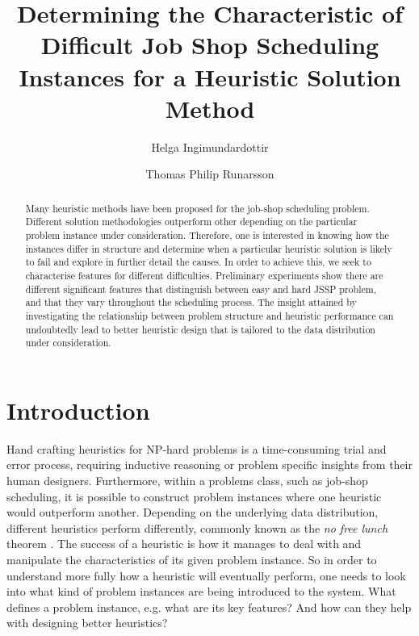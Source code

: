\documentclass[10pt]{llncs} %
\begin{document}
\title{Determining the Characteristic of Difficult Job Shop Scheduling Instances for a Heuristic Solution Method}

\author{Helga Ingimundardottir \and Thomas Philip Runarsson}


\maketitle

\begin{abstract} 
Many heuristic methods have been proposed for the job-shop scheduling problem. Different solution methodologies outperform other depending on the particular problem instance under consideration. Therefore, one is interested in knowing how the instances differ in structure and determine when a particular heuristic solution is likely to fail and explore in further detail the causes. In order to achieve this, we seek to characterise features for different difficulties. Preliminary experiments show there are different significant features that distinguish between easy and hard JSSP problem, and that they vary throughout the scheduling process. 
The insight attained by investigating the relationship between problem structure and heuristic performance can undoubtedly lead to better heuristic design that is tailored to the data distribution under consideration.
\end{abstract}


\section{Introduction}\label{sec:introduction}
Hand crafting heuristics for NP-hard problems is a time-consuming trial and error process, requiring inductive reasoning or problem specific insights from their human designers. Furthermore, within a problems class, such as job-shop scheduling, it is possible to construct problem instances where one heuristic would outperform another. 
Depending on the underlying data distribution, different heuristics perform differently, commonly known as the \emph{no free lunch} theorem \cite{WoMa97:tec}. The success of a heuristic is how it manages to deal with and manipulate the characteristics of its given problem instance. So in order to understand more fully how a heuristic will eventually perform, one needs to look into what kind of problem instances are being introduced to the system. What defines a problem instance, e.g. what are its key features? And how can they help with designing better heuristics?
\end{document}
